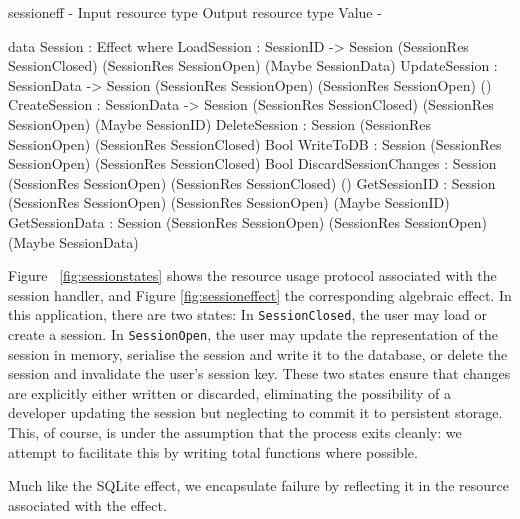 \begin{SaveVerbatim}{sessioneff}
{-                        { Input resource type }            { Output resource type }   { Value }        -}

data Session : Effect where
  LoadSession           : SessionID -> 
                          Session (SessionRes SessionClosed) (SessionRes SessionOpen)   (Maybe SessionData)
  UpdateSession         : SessionData -> 
                          Session (SessionRes SessionOpen)   (SessionRes SessionOpen)   ()
  CreateSession         : SessionData -> 
                          Session (SessionRes SessionClosed) (SessionRes SessionOpen)   (Maybe SessionID)
  DeleteSession         : Session (SessionRes SessionOpen)   (SessionRes SessionClosed) Bool 
  WriteToDB             : Session (SessionRes SessionOpen)   (SessionRes SessionClosed) Bool
  DiscardSessionChanges : Session (SessionRes SessionOpen)   (SessionRes SessionClosed) ()
  GetSessionID          : Session (SessionRes SessionOpen)   (SessionRes SessionOpen)   (Maybe SessionID)
  GetSessionData        : Session (SessionRes SessionOpen)   (SessionRes SessionOpen)   (Maybe SessionData)
\end{SaveVerbatim}

\begin{figure*}[t]
\begin{center}
\end{center}
\caption{Session Effect}
\label{fig:sessioneffect}
\end{figure*}

Figure ~\ref{fig:sessionstates} shows the resource usage protocol associated
with the session handler, and Figure \ref{fig:sessioneffect} the corresponding
algebraic effect. In this application, there are two states:
In \texttt{SessionClosed}, the user may load or create a
session.
In \texttt{SessionOpen}, the user may update the
representation of the session in memory, serialise the session and write it to
the database, or delete the session and invalidate the user's session key. 
These two states ensure that changes are explicitly either
written or discarded, eliminating the possibility of a developer updating the
session but neglecting to commit it to persistent storage. This, of course, is
under the assumption that the process exits cleanly: we attempt to facilitate
this by writing total functions where possible.

Much like the SQLite effect, we encapsulate failure by reflecting it in the
resource associated with the effect. 

